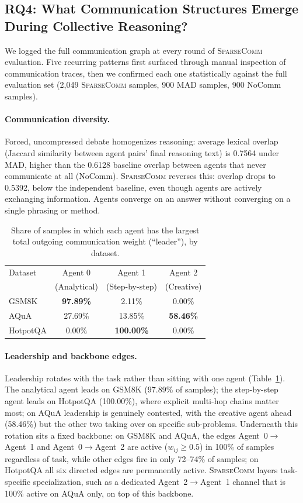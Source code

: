 \documentclass[11pt]{article}
\newcommand{\sys}{\textsc{SparseComm}\xspace}
\begin{document}
\subsection{RQ4: What Communication Structures Emerge During Collective Reasoning?}
\label{sec:rq4}

We logged the full communication graph at every round of \sys evaluation.
Five recurring patterns first surfaced through manual inspection of
communication traces, then we confirmed each one statistically against the
full evaluation set (2,049 \sys samples, 900 MAD samples, 900 NoComm
samples).

\paragraph{Communication diversity.} Forced, uncompressed debate
homogenizes reasoning: average lexical overlap (Jaccard similarity between
agent pairs' final reasoning text) is 0.7564 under MAD, higher than the
0.6128 baseline overlap between agents that never communicate at all
(NoComm). \sys reverses this: overlap drops to 0.5392, below the
independent baseline, even though agents are actively exchanging
information. Agents converge on an answer without converging on a single
phrasing or method.

\begin{table}[t]
\centering
\small
\begin{tabular}{lccc}
\toprule
Dataset & Agent 0 & Agent 1 & Agent 2 \\
        & (Analytical) & (Step-by-step) & (Creative) \\
\midrule
GSM8K    & \textbf{97.89\%} & 2.11\%   & 0.00\% \\
AQuA     & 27.69\%          & 13.85\%  & \textbf{58.46\%} \\
HotpotQA & 0.00\%           & \textbf{100.00\%} & 0.00\% \\
\bottomrule
\end{tabular}
\caption{Share of samples in which each agent has the largest total
outgoing communication weight (``leader''), by dataset.}
\label{tab:leadership}
\end{table}

\paragraph{Leadership and backbone edges.} Leadership rotates with the task
rather than sitting with one agent (Table~\ref{tab:leadership}). The
analytical agent leads on GSM8K (97.89\% of samples); the step-by-step
agent leads on HotpotQA (100.00\%), where explicit multi-hop chains matter
most; on AQuA leadership is genuinely contested, with the creative agent
ahead (58.46\%) but the other two taking over on specific sub-problems.
Underneath this rotation sits a fixed backbone: on GSM8K and AQuA, the
edges Agent~0$\to$Agent~1 and Agent~0$\to$Agent~2 are active
($w_{ij}\ge0.5$) in 100\% of samples regardless of task, while other edges
fire in only 72--74\% of samples; on HotpotQA all six directed edges are
permanently active. \sys layers task-specific specialization, such as a
dedicated Agent~2$\to$Agent~1 channel that is 100\% active on AQuA only, on
top of this backbone.
\end{document}
